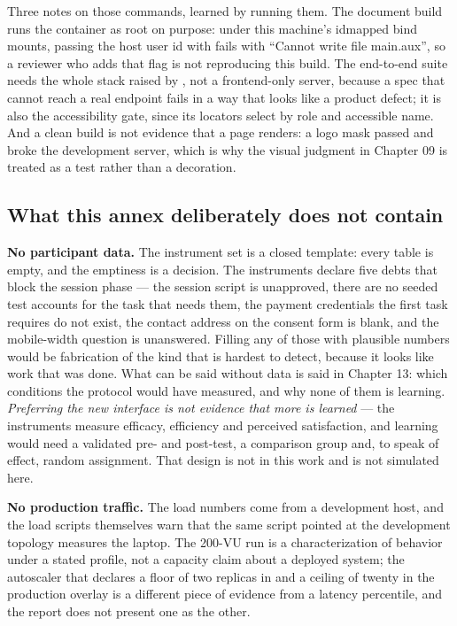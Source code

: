 Three notes on those commands, learned by running them. The document build runs the container as
root on purpose: under this machine's idmapped bind mounts, passing the host user id with
 fails with \enquote{Cannot write file main.aux}, so a reviewer who adds that flag is not
reproducing this build. The end-to-end suite needs the whole stack raised by , not a
frontend-only server, because a spec that cannot reach a real endpoint fails in a way that looks
like a product defect; it is also the accessibility gate, since its locators select by role and
accessible name. And a clean build is not evidence that a page renders: a logo mask passed
 and broke the development server, which is why the visual judgment in
Chapter 09 is treated as a test rather than a decoration.

\subsection{What this annex deliberately does not contain}

\textbf{No participant data.} The instrument set is a closed template: every table is empty, and
the emptiness is a decision. The instruments declare five debts that block the session phase — the
session script is unapproved, there are no seeded test accounts for the task that needs them, the
payment credentials the first task requires do not exist, the contact address on the consent form
is blank, and the mobile-width question is unanswered. Filling any of those with plausible numbers
would be fabrication of the kind that is hardest to detect, because it looks like work that was
done. What can be said without data is said in Chapter 13: which conditions the protocol would
have measured, and why none of them is learning. \emph{Preferring the new interface is not
evidence that more is learned} — the instruments measure efficacy, efficiency and perceived
satisfaction, and learning would need a validated pre- and post-test, a comparison group and, to
speak of effect, random assignment. That design is not in this work and is not simulated here.


\textbf{No production traffic.} The load numbers come from a development host, and the load scripts
themselves warn that the same script pointed at the development topology measures the laptop. The
200-VU run is a characterization of behavior under a stated profile, not a capacity claim about a
deployed system; the autoscaler that declares a floor of two replicas in 
and a ceiling of twenty in the production overlay is a different piece of evidence from a latency
percentile, and the report does not present one as the other.

